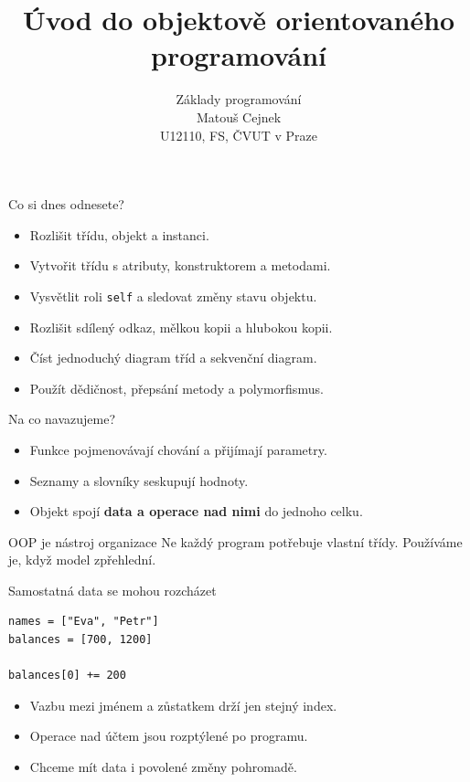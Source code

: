 \documentclass[aspectratio=169]{beamer}
\title{Úvod do objektově orientovaného programování}
\subtitle{Základy programování\\Matouš Cejnek\\U12110, FS, ČVUT v Praze}
\author{}
\institute{}
\date{}
\newcommand{\term}[1]{\textcolor{CodeBlue}{\textbf{#1}}}
\begin{document}
\begin{frame}
  \clearpage\thispagestyle{empty}\titlepage
\end{frame}

\begin{frame}{Co si dnes odnesete?}
  \begin{itemize}
    \item Rozlišit třídu, objekt a instanci.
    \item Vytvořit třídu s atributy, konstruktorem a metodami.
    \item Vysvětlit roli \texttt{self} a sledovat změny stavu objektu.
    \item Rozlišit sdílený odkaz, mělkou kopii a hlubokou kopii.
    \item Číst jednoduchý diagram tříd a sekvenční diagram.
    \item Použít dědičnost, přepsání metody a polymorfismus.
  \end{itemize}
\end{frame}

\begin{frame}{Na co navazujeme?}
  \begin{itemize}
    \item Funkce pojmenovávají chování a přijímají parametry.
    \item Seznamy a slovníky seskupují hodnoty.
    \item Objekt spojí \term{data a operace nad nimi} do jednoho celku.
  \end{itemize}
  \begin{block}{OOP je nástroj organizace}
    Ne každý program potřebuje vlastní třídy. Používáme je, když model zpřehlední.
  \end{block}
\end{frame}

\begin{frame}[fragile]{Samostatná data se mohou rozcházet}
\begin{lstlisting}[style=python]
names = ["Eva", "Petr"]
balances = [700, 1200]

balances[0] += 200
\end{lstlisting}
  \begin{itemize}
    \item Vazbu mezi jménem a zůstatkem drží jen stejný index.
    \item Operace nad účtem jsou rozptýlené po programu.
    \item Chceme mít data i povolené změny pohromadě.
  \end{itemize}
\end{frame}
\end{document}
